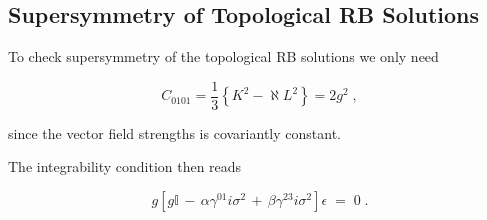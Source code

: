 \documentclass[12pt,a4paper]{article}
\begin{document}



\subsection{Supersymmetry of Topological RB Solutions}
\label{sec-susy-RB}

To check supersymmetry of the topological RB solutions we only need

\begin{equation}
C_{0101} = 
\textstyle{\frac{1}{3}}\left\{K^{2}-\aleph L^{2}\right\}= 2g^{2} \; ,
\end{equation}

\noindent since the vector field strengths is covariantly constant.

The integrability condition then reads

\begin{equation}
g\left[
     g\mathbb{I} 
  \,-\,\alpha\gamma^{01}i\sigma^{2}
  \,+\,\beta \gamma^{23}i\sigma^{2}
\right] \epsilon \;=\; 0 \; .
\end{equation}
\end{document}
